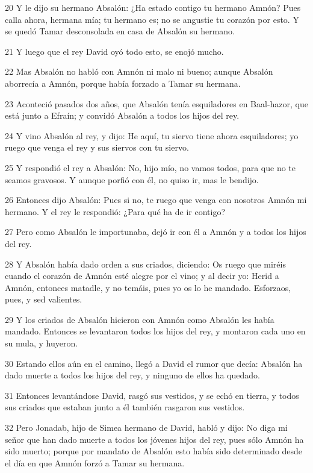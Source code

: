\par 20 Y le dijo su hermano Absalón: ¿Ha estado contigo tu hermano Amnón? Pues calla ahora, hermana mía; tu hermano es; no se angustie tu corazón por esto. Y se quedó Tamar desconsolada en casa de Absalón su hermano.
\par 21 Y luego que el rey David oyó todo esto, se enojó mucho.
\par 22 Mas Absalón no habló con Amnón ni malo ni bueno; aunque Absalón aborrecía a Amnón, porque había forzado a Tamar su hermana.
\par 23 Aconteció pasados dos años, que Absalón tenía esquiladores en Baal-hazor, que está junto a Efraín; y convidó Absalón a todos los hijos del rey.
\par 24 Y vino Absalón al rey, y dijo: He aquí, tu siervo tiene ahora esquiladores; yo ruego que venga el rey y sus siervos con tu siervo.
\par 25 Y respondió el rey a Absalón: No, hijo mío, no vamos todos, para que no te seamos gravosos. Y aunque porfió con él, no quiso ir, mas le bendijo.
\par 26 Entonces dijo Absalón: Pues si no, te ruego que venga con nosotros Amnón mi hermano. Y el rey le respondió: ¿Para qué ha de ir contigo?
\par 27 Pero como Absalón le importunaba, dejó ir con él a Amnón y a todos los hijos del rey.
\par 28 Y Absalón había dado orden a sus criados, diciendo: Os ruego que miréis cuando el corazón de Amnón esté alegre por el vino; y al decir yo: Herid a Amnón, entonces matadle, y no temáis, pues yo os lo he mandado. Esforzaos, pues, y sed valientes.
\par 29 Y los criados de Absalón hicieron con Amnón como Absalón les había mandado. Entonces se levantaron todos los hijos del rey, y montaron cada uno en su mula, y huyeron.
\par 30 Estando ellos aún en el camino, llegó a David el rumor que decía: Absalón ha dado muerte a todos los hijos del rey, y ninguno de ellos ha quedado.
\par 31 Entonces levantándose David, rasgó sus vestidos, y se echó en tierra, y todos sus criados que estaban junto a él también rasgaron sus vestidos.
\par 32 Pero Jonadab, hijo de Simea hermano de David, habló y dijo: No diga mi señor que han dado muerte a todos los jóvenes hijos del rey, pues sólo Amnón ha sido muerto; porque por mandato de Absalón esto había sido determinado desde el día en que Amnón forzó a Tamar su hermana.
